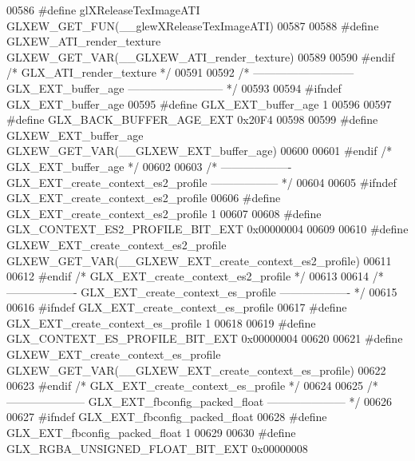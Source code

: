 \begin{DoxyCode}
00586 \textcolor{preprocessor}{#define glXReleaseTexImageATI GLXEW\_GET\_FUN(\_\_glewXReleaseTexImageATI)}
00587 
00588 \textcolor{preprocessor}{#define GLXEW\_ATI\_render\_texture GLXEW\_GET\_VAR(\_\_GLXEW\_ATI\_render\_texture)}
00589 
00590 \textcolor{preprocessor}{#endif }\textcolor{comment}{/* GLX\_ATI\_render\_texture */}\textcolor{preprocessor}{}
00591 
00592 \textcolor{comment}{/* --------------------------- GLX\_EXT\_buffer\_age -------------------------- */}
00593 
00594 \textcolor{preprocessor}{#ifndef GLX\_EXT\_buffer\_age}
00595 \textcolor{preprocessor}{#define GLX\_EXT\_buffer\_age 1}
00596 
00597 \textcolor{preprocessor}{#define GLX\_BACK\_BUFFER\_AGE\_EXT 0x20F4}
00598 
00599 \textcolor{preprocessor}{#define GLXEW\_EXT\_buffer\_age GLXEW\_GET\_VAR(\_\_GLXEW\_EXT\_buffer\_age)}
00600 
00601 \textcolor{preprocessor}{#endif }\textcolor{comment}{/* GLX\_EXT\_buffer\_age */}\textcolor{preprocessor}{}
00602 
00603 \textcolor{comment}{/* ------------------- GLX\_EXT\_create\_context\_es2\_profile ------------------ */}
00604 
00605 \textcolor{preprocessor}{#ifndef GLX\_EXT\_create\_context\_es2\_profile}
00606 \textcolor{preprocessor}{#define GLX\_EXT\_create\_context\_es2\_profile 1}
00607 
00608 \textcolor{preprocessor}{#define GLX\_CONTEXT\_ES2\_PROFILE\_BIT\_EXT 0x00000004}
00609 
00610 \textcolor{preprocessor}{#define GLXEW\_EXT\_create\_context\_es2\_profile GLXEW\_GET\_VAR(\_\_GLXEW\_EXT\_create\_context\_es2\_profile)}
00611 
00612 \textcolor{preprocessor}{#endif }\textcolor{comment}{/* GLX\_EXT\_create\_context\_es2\_profile */}\textcolor{preprocessor}{}
00613 
00614 \textcolor{comment}{/* ------------------- GLX\_EXT\_create\_context\_es\_profile ------------------- */}
00615 
00616 \textcolor{preprocessor}{#ifndef GLX\_EXT\_create\_context\_es\_profile}
00617 \textcolor{preprocessor}{#define GLX\_EXT\_create\_context\_es\_profile 1}
00618 
00619 \textcolor{preprocessor}{#define GLX\_CONTEXT\_ES\_PROFILE\_BIT\_EXT 0x00000004}
00620 
00621 \textcolor{preprocessor}{#define GLXEW\_EXT\_create\_context\_es\_profile GLXEW\_GET\_VAR(\_\_GLXEW\_EXT\_create\_context\_es\_profile)}
00622 
00623 \textcolor{preprocessor}{#endif }\textcolor{comment}{/* GLX\_EXT\_create\_context\_es\_profile */}\textcolor{preprocessor}{}
00624 
00625 \textcolor{comment}{/* --------------------- GLX\_EXT\_fbconfig\_packed\_float --------------------- */}
00626 
00627 \textcolor{preprocessor}{#ifndef GLX\_EXT\_fbconfig\_packed\_float}
00628 \textcolor{preprocessor}{#define GLX\_EXT\_fbconfig\_packed\_float 1}
00629 
00630 \textcolor{preprocessor}{#define GLX\_RGBA\_UNSIGNED\_FLOAT\_BIT\_EXT 0x00000008}

\end{DoxyCode}
